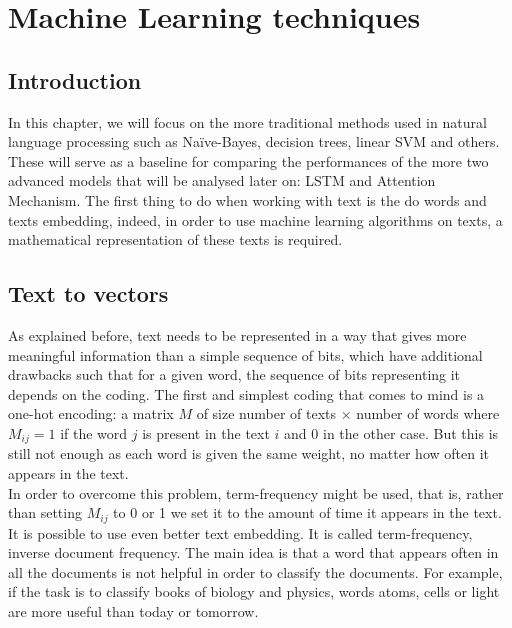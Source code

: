 ﻿\chapter{Machine Learning techniques} \label{chap3}
\section{Introduction}
In this chapter, we will focus on the more traditional methods used in natural language processing such as Na\"{i}ve-Bayes, decision trees, linear SVM and others. These will serve as a baseline for comparing the performances of the more two advanced models that will be analysed later on: LSTM and Attention Mechanism. The first thing to do when working with text is the do words and texts embedding, indeed, in order to use machine learning algorithms on texts, a mathematical representation of these texts is required. 
\section{Text to vectors}
As explained before, text needs to be represented in a way that gives more meaningful information than a simple sequence of bits, which have additional drawbacks such that for a given word, the sequence of bits representing it depends on the coding.
 The first and simplest coding that comes to mind is a one-hot encoding: a matrix $M$ of size number of texts $\times$ number of words where $M_{ij} = 1$ if the word $j$ is present in the text  $i$ and $0$ in the other case. But this is still not enough as each word is given the same weight, no matter how often it appears in the text. \\ 

 In order to overcome this problem, term-frequency might be used, that is, rather than setting $M_{ij}$ to 0 or 1 we set it to the amount of time it appears in the text. \\ 

 It is possible to use even better text embedding. It is called term-frequency, inverse document frequency. The main idea is that a word that appears often in all the documents is not helpful in order to classify the documents. For example, if the task is to classify books of biology and physics, words atoms, cells or light are more useful than today or tomorrow. \\

